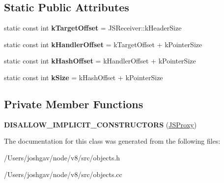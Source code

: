 \subsection*{Static Public Attributes}
\begin{DoxyCompactItemize}
\item 
static const int {\bfseries k\+Target\+Offset} = J\+S\+Receiver\+::k\+Header\+Size\hypertarget{classv8_1_1internal_1_1_j_s_proxy_a9ec8e4f9abd9d8bed7da483d2fc8c055}{}\label{classv8_1_1internal_1_1_j_s_proxy_a9ec8e4f9abd9d8bed7da483d2fc8c055}

\item 
static const int {\bfseries k\+Handler\+Offset} = k\+Target\+Offset + k\+Pointer\+Size\hypertarget{classv8_1_1internal_1_1_j_s_proxy_aa806e0b972c00bd7011605e4859a4a0e}{}\label{classv8_1_1internal_1_1_j_s_proxy_aa806e0b972c00bd7011605e4859a4a0e}

\item 
static const int {\bfseries k\+Hash\+Offset} = k\+Handler\+Offset + k\+Pointer\+Size\hypertarget{classv8_1_1internal_1_1_j_s_proxy_a168ff8fa92638a10a3cdd1f4701097df}{}\label{classv8_1_1internal_1_1_j_s_proxy_a168ff8fa92638a10a3cdd1f4701097df}

\item 
static const int {\bfseries k\+Size} = k\+Hash\+Offset + k\+Pointer\+Size\hypertarget{classv8_1_1internal_1_1_j_s_proxy_a59ed1c6e05e6ea07645c40c9567bfe8c}{}\label{classv8_1_1internal_1_1_j_s_proxy_a59ed1c6e05e6ea07645c40c9567bfe8c}

\end{DoxyCompactItemize}
\subsection*{Private Member Functions}
\begin{DoxyCompactItemize}
\item 
{\bfseries D\+I\+S\+A\+L\+L\+O\+W\+\_\+\+I\+M\+P\+L\+I\+C\+I\+T\+\_\+\+C\+O\+N\+S\+T\+R\+U\+C\+T\+O\+RS} (\hyperlink{classv8_1_1internal_1_1_j_s_proxy}{J\+S\+Proxy})\hypertarget{classv8_1_1internal_1_1_j_s_proxy_a1be352441a993c6da267a11bedd0999e}{}\label{classv8_1_1internal_1_1_j_s_proxy_a1be352441a993c6da267a11bedd0999e}

\end{DoxyCompactItemize}


The documentation for this class was generated from the following files\+:\begin{DoxyCompactItemize}
\item 
/\+Users/joshgav/node/v8/src/objects.\+h\item 
/\+Users/joshgav/node/v8/src/objects.\+cc\end{DoxyCompactItemize}
